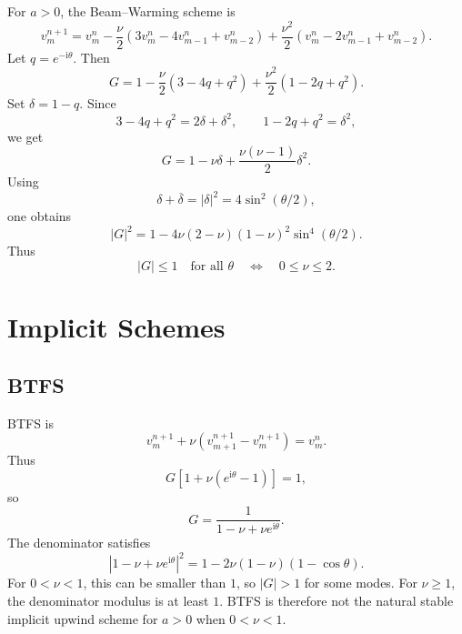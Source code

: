 \documentclass[11pt]{article}
\newcommand{\ii}{\mathrm{i}}
\begin{document}
For $a>0$, the Beam--Warming scheme is
\begin{equation}
    v_m^{n+1}
    =
    v_m^n
    -\frac{\nu}{2}(3v_m^n-4v_{m-1}^n+v_{m-2}^n)
    +\frac{\nu^2}{2}(v_m^n-2v_{m-1}^n+v_{m-2}^n).
\end{equation}
Let $q=e^{-\ii\theta}$.  Then
\begin{equation}
    G=
    1-\frac{\nu}{2}(3-4q+q^2)
    +\frac{\nu^2}{2}(1-2q+q^2).
\end{equation}
Set $\delta=1-q$.  Since
\begin{equation}
    3-4q+q^2=2\delta+\delta^2,
    \qquad
    1-2q+q^2=\delta^2,
\end{equation}
we get
\begin{equation}
    G=1-\nu\delta+\frac{\nu(\nu-1)}{2}\delta^2.
\end{equation}
Using
\begin{equation}
    \delta+\overline{\delta}=|\delta|^2
    =
    4\sin^2(\theta/2),
\end{equation}
one obtains
\begin{equation}
    |G|^2
    =
    1-4\nu(2-\nu)(1-\nu)^2\sin^4(\theta/2).
\end{equation}
Thus
\begin{equation}
    |G|\le1\quad\text{for all }\theta
    \quad\Longleftrightarrow\quad
    0\le\nu\le2.
\end{equation}

\section{Implicit Schemes}

\subsection{BTFS}

BTFS is
\begin{equation}
    v_m^{n+1}
    +\nu(v_{m+1}^{n+1}-v_m^{n+1})=v_m^n.
\end{equation}
Thus
\begin{equation}
    G\left[1+\nu(e^{\ii\theta}-1)\right]=1,
\end{equation}
so
\begin{equation}
    G=\frac{1}{1-\nu+\nu e^{\ii\theta}}.
\end{equation}
The denominator satisfies
\begin{equation}
    |1-\nu+\nu e^{\ii\theta}|^2
    =
    1-2\nu(1-\nu)(1-\cos\theta).
\end{equation}
For $0<\nu<1$, this can be smaller than $1$, so $|G|>1$ for some modes.  For $\nu\ge1$, the denominator modulus is at least $1$.  BTFS is therefore not the natural stable implicit upwind scheme for $a>0$ when $0<\nu<1$.
\end{document}
